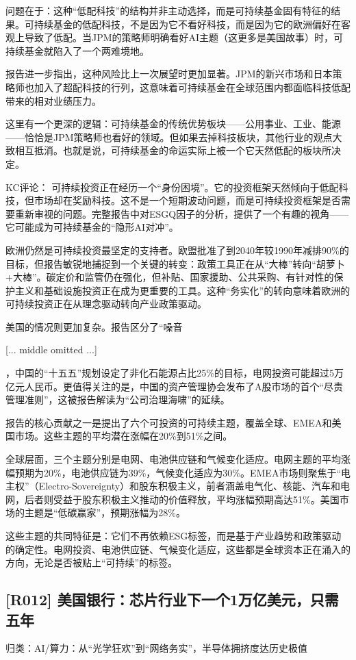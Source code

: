\documentclass[11pt]{ctexart}
\begin{document}
问题在于：这种“低配科技”的结构并非主动选择，而是可持续基金固有特征的结果。可持续基金的低配科技，不是因为它不看好科技，而是因为它的欧洲偏好在客观上导致了低配。当JPM的策略师明确看好AI主题（这更多是美国故事）时，可持续基金就陷入了一个两难境地。

报告进一步指出，这种风险比上一次展望时更加显著。JPM的新兴市场和日本策略师也加入了超配科技的行列，这意味着可持续基金在全球范围内都面临科技低配带来的相对业绩压力。

这里有一个更深的逻辑：可持续基金的传统优势板块——公用事业、工业、能源——恰恰是JPM策略师也看好的领域。但如果去掉科技板块，其他行业的观点大致相互抵消。也就是说，可持续基金的命运实际上被一个它天然低配的板块所决定。

KC评论： 可持续投资正在经历一个“身份困境”。它的投资框架天然倾向于低配科技，但市场却在奖励科技。这不是一个短期波动问题，而是可持续投资框架是否需要重新审视的问题。完整报告中对ESGQ因子的分析，提供了一个有趣的视角——它可能成为可持续基金的“隐形AI对冲”。

欧洲仍然是可持续投资最坚定的支持者。欧盟批准了到2040年较1990年减排90\%的目标，但报告敏锐地捕捉到一个关键的转变：政策工具正在从“大棒”转向“胡萝卜+大棒”。碳定价和监管仍在强化，但补贴、国家援助、公共采购、有针对性的保护主义和基础设施投资正在成为更重要的工具。这种“务实化”的转向意味着欧洲的可持续投资正在从理念驱动转向产业政策驱动。

美国的情况则更加复杂。报告区分了“噪音

[... middle omitted ...]

，中国的“十五五”规划设定了非化石能源占比25\%的目标，电网投资可能超过5万亿元人民币。更值得关注的是，中国的资产管理协会发布了A股市场的首个“尽责管理准则”，这被报告解读为“公司治理海啸”的延续。

报告的核心贡献之一是提出了六个可投资的可持续主题，覆盖全球、EMEA和美国市场。这些主题的平均潜在涨幅在20\%到51\%之间。

全球层面，三个主题分别是电网、电池供应链和气候变化适应。电网主题的平均涨幅预期为20\%，电池供应链为39\%，气候变化适应为30\%。EMEA市场则聚焦于“电主权”（Electro-Sovereignty）和股东积极主义，前者涵盖电气化、核能、汽车和电网，后者则受益于股东积极主义推动的价值释放，平均涨幅预期高达51\%。美国市场的主题是“低碳赢家”，预期涨幅为28\%。

这些主题的共同特征是：它们不再依赖ESG标签，而是基于产业趋势和政策驱动的确定性。电网投资、电池供应链、气候变化适应，这些都是全球资本正在涌入的方向，无论是否被贴上“可持续”的标签。

\subsection{[R012] 美国银行：芯片行业下一个1万亿美元，只需五年}
{\small\color{refgray}归类：AI/算力：从“光学狂欢”到“网络务实”，半导体拥挤度达历史极值}
\end{document}
